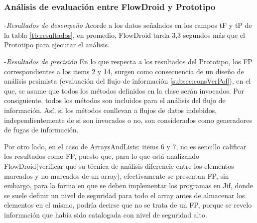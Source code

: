 \subsubsection{Análisis de evaluación entre FlowDroid y Prototipo}
-\textit{Resultados de desempeño}\newline
Acorde a los datos señalados en los campos tF y tP de la tabla
\ref{tb:resultados}, en promedio, FlowDroid tarda 3,3 segundos más que el
Prototipo para ejecutar el análisis.

-\textit{Resultados de precisión}\newline
En lo que respecta a los resultados del Prototipo, los FP correspondientes a los
items 2 y 14, surgen como consecuencia de un diseño de análisis
pesimista (evaluación del flujo de información \ref{subsec:consVerPol}), en el
que, se asume que todos los métodos definidos en la clase serán invocados. Por
consiguiente, todos los métodos son incluidos para el análisis del flujo de
información. Así, si los métodos conllevan a flujos de datos indebidos,
independientemente de si son invocados o no, son considerados como generadores
de fugas de información.\newline 

Por otro lado, en el caso de ArraysAndLists: items 6 y 7, no es sencillo
calificar los resultados como FP, puesto que, para lo que está analizando
FlowDroid(verificar que su técnica de análisis diferencie entre los elementos
marcados y no marcados de un array), efectivamente se presentan FP, sin embargo,
para la forma en que se deben implementar los programas en Jif, donde se suele
definir un nivel de seguridad para todo el array antes de almacenar los
elementos en el mismo, podría decirse que no se trata de un FP, porque se revelo
información que había sido catalogada con nivel de seguridad alto.


